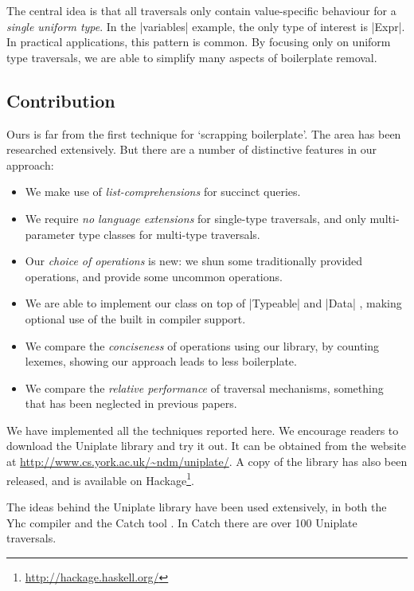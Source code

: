 \documentclass[preprint]{sigplanconf}
\begin{document}
The central idea is that all traversals only contain value-specific behaviour for a \textit{single uniform type}. In the |variables| example, the only type of interest is |Expr|. In practical applications, this pattern is common. By focusing only on uniform type traversals, we are able to simplify many aspects of boilerplate removal.

\subsection{Contribution}

Ours is far from the first technique for `scrapping boilerplate'. The area has been researched extensively. But there are a number of distinctive features in our approach:

\begin{itemize}
\item We make use of \textit{list-comprehensions} \citep{wadler:list_comprehensions} for succinct queries.
\item We require \textit{no language extensions} for single-type traversals, and only multi-parameter type classes \citep{jones:mptc} for multi-type traversals.
\item Our \textit{choice of operations} is new: we shun some traditionally provided operations, and provide some uncommon operations.
\item We are able to implement our class on top of |Typeable| and |Data| \citep{lammel:syb}, making optional use of the built in compiler support.
\item We compare the \textit{conciseness} of operations using our library, by counting lexemes, showing our approach leads to less boilerplate.
\item We compare the \textit{relative performance} of traversal mechanisms, something that has been neglected in previous papers.
\end{itemize}

We have implemented all the techniques reported here. We encourage readers to download the Uniplate library and try it out. It can be obtained from the website at \url{http://www.cs.york.ac.uk/~ndm/uniplate/}. A copy of the library has also been released, and is available on Hackage\footnote{\url{http://hackage.haskell.org/}}.

The ideas behind the Uniplate library have been used extensively, in both the Yhc compiler \citep{yhc} and the Catch tool \citep{me:catch_tfp}. In Catch there are over 100 Uniplate traversals.
\end{document}
